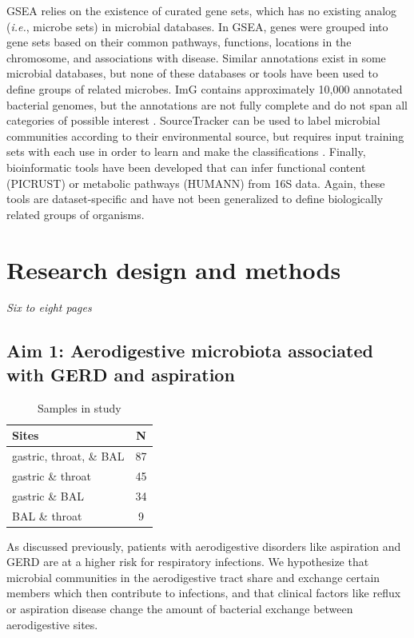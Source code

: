 \documentclass[12pt]{article}
\begin{document}
GSEA relies on the existence of curated gene sets, which has no 
existing analog (\textit{i.e.}, microbe sets) in microbial databases. 
In GSEA, genes were grouped into gene sets based on their common 
pathways, functions, locations in the chromosome, and associations 
with disease. Similar annotations exist in some microbial databases, 
but none of these databases or tools have been used to define groups 
of related microbes. ImG contains approximately 10,000 annotated 
bacterial genomes, but the annotations are not fully complete and do 
not span all categories of possible interest \cite{markowitz-img-2013}. SourceTracker 
can be used to label microbial communities according to their 
environmental source, but requires input training sets with each use 
in order to learn and make the classifications \cite{knights-sourcetracker-2011}. 
Finally, bioinformatic tools have been developed that can infer functional 
content (PICRUST) \cite{langille-picrust-2013} or metabolic pathways 
(HUMANN) \cite{abubucker-humann-2012} from 16S data. Again, 
these tools are dataset-specific and have not been generalized to 
define biologically related groups of organisms.

\section{Research design and methods}
\textit{Six to eight pages}

\subsection{Aim 1: Aerodigestive microbiota associated with GERD and aspiration}

\begin{table}
\begin{tabular}{|l|c|}
	\hline
	\textbf{Sites} & \textbf{N} \\
	\hline
	gastric, throat, \& BAL & 87 \\
	gastric \& throat & 45 \\
	gastric \& BAL & 34 \\
	BAL \& throat & 9 \\
	\hline 
\end{tabular}
\caption{Samples in study}\label{tab:rosen_samples}
\end{table}

As discussed previously, patients with aerodigestive disorders like 
aspiration and GERD are at a higher risk for respiratory infections. 
We hypothesize that microbial communities in the aerodigestive tract 
share and exchange certain members which then contribute to 
infections, and that clinical factors like reflux or aspiration 
disease change the amount of bacterial exchange between aerodigestive 
sites.
\end{document}

